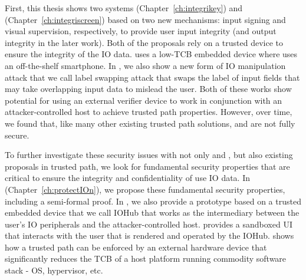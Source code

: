 First, this thesis shows two systems \integrikey (Chapter~\ref{ch:integrikey}) and \integriscreen (Chapter~\ref{ch:integriscreen}) based on two new mechanisms: input signing and visual supervision, respectively, to provide user input integrity (and output integrity in the later work). Both of the proposals rely on a trusted device to ensure the integrity of the IO data. \integrikey uses a low-TCB embedded device where \integriscreen uses an off-the-shelf smartphone. In \integrikey, we also show a new form of IO manipulation attack that we call label swapping attack that swaps the label of input fields that may take overlapping input data to mislead the user. Both of these works show potential for using an external verifier device to work in conjunction with an attacker-controlled host to achieve trusted path properties. However, over time, we found that, like many other existing trusted path solutions, \integrikey and \integriscreen are not fully secure.

To further investigate these security issues with not only \integrikey and \integriscreen, but also existing proposals in trusted path, we look for fundamental security properties that are critical to ensure the integrity and confidentiality of use IO data. In \protection (Chapter~\ref{ch:protectIOn}), we propose these fundamental security properties, including a semi-formal proof. In \protection, we also provide a prototype based on a trusted embedded device that we call IOHub that works as the intermediary between the user's IO peripherals and the attacker-controlled host. \protection provides a sandboxed UI that interacts with the user that is rendered and operated by the IOHub. \protection shows how a trusted path can be enforced by an external hardware device that significantly reduces the TCB of a host platform running commodity software stack - OS, hypervisor, etc.


